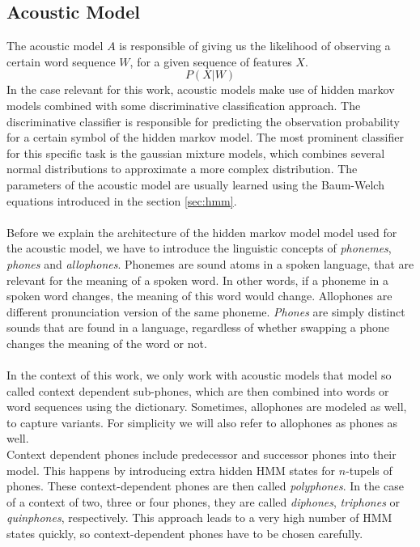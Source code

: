 
\subsection{Acoustic Model}
\label{sec:acoustic_model}
The acoustic model $A$ is responsible of giving us the likelihood of observing a certain word sequence $W$, for a given sequence of features $X$. 
\[
	P(X|W)
\]
In the case relevant for this work, acoustic models make use of hidden markov models combined with some discriminative classification approach. The discriminative classifier is responsible for predicting the observation probability for a certain symbol of the hidden markov model. The most prominent classifier for this specific task is the gaussian mixture models, which combines several normal distributions to approximate a more complex distribution. The parameters of the acoustic model are usually learned using the Baum-Welch equations introduced in the section \ref{sec:hmm}. \\ \\
Before we explain the architecture of the hidden markov model model used for the acoustic model, we have to introduce the linguistic concepts of \textit{phonemes}, \textit{phones} and \textit{allophones}. Phonemes are sound atoms in a spoken language, that are relevant for the meaning of a spoken word. In other words, if a phoneme in a spoken word changes, the meaning of this word would change. Allophones are different pronunciation version of the same phoneme. \textit{Phones} are simply distinct sounds that are found in a language, regardless of whether swapping a phone changes the meaning of the word or not. \\ \\
In the context of this work, we only work with acoustic models that model so called context dependent sub-phones, which are then combined into words or word sequences using the dictionary. Sometimes, allophones are modeled as well, to capture variants. For simplicity we will also refer to allophones as phones as well. \\
Context dependent phones include predecessor and successor phones into their model. This happens by introducing extra hidden HMM states for $n$-tupels of phones. These context-dependent phones are then called \textit{polyphones}. In the case of a context of two, three or four phones, they are called \textit{diphones}, \textit{triphones} or \textit{quinphones}, respectively. This approach leads to a very high number of HMM states quickly, so context-dependent phones have to be chosen carefully. \\
